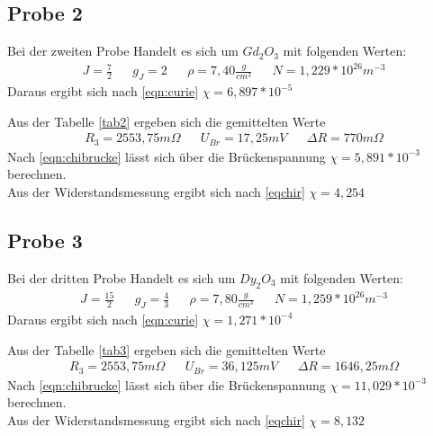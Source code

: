 \subsection{Probe 2}
Bei der zweiten Probe Handelt es sich um $Gd_2O_3$ mit folgenden Werten:
\begin{align*}
&J=\frac72&
&g_J=2&
&\rho=7,40\frac{g}{cm^3}&
&N=1,229*10^{26}m^{-3}&
\end{align*}
Daraus ergibt sich nach \eqref{eqn:curie}
$\chi=6,897*10^{-5}$

Aus der Tabelle \ref{tab2} ergeben sich die gemittelten Werte
\begin{align*}
&R_3=2553,75m\Omega&
&U_{Br}=17,25mV&
&\Delta R=770m\Omega&
\end{align*}
Nach \eqref{eqn:chibrucke} lässt sich über die Brückenspannung
$\chi=5,891*10^{-3}$
berechnen.
\\
Aus der Widerstandsmessung ergibt sich nach \eqref{eqchir}
$\chi=4,254$


\subsection{Probe 3}
Bei der dritten Probe Handelt es sich um $Dy_2O_3$ mit folgenden Werten:
\begin{align*}
&J=\frac{15}{2}&
&g_J=\frac43&
&\rho=7,80\frac{g}{cm^3}&
&N=1,259*10^{26}m^{-3}&
\end{align*}
Daraus ergibt sich nach \eqref{eqn:curie} 
$\chi=1,271*10^{-4}$

Aus der Tabelle \ref{tab3} ergeben sich die gemittelten Werte
\begin{align*}
&R_3=2553,75m\Omega&
&U_{Br}=36,125mV&
&\Delta R=1646,25m\Omega&
\end{align*}
Nach \eqref{eqn:chibrucke} lässt sich über die Brückenspannung
$\chi=11,029*10^{-3}$
berechnen.
\\
Aus der Widerstandsmessung ergibt sich nach \eqref{eqchir}
$\chi=8,132$